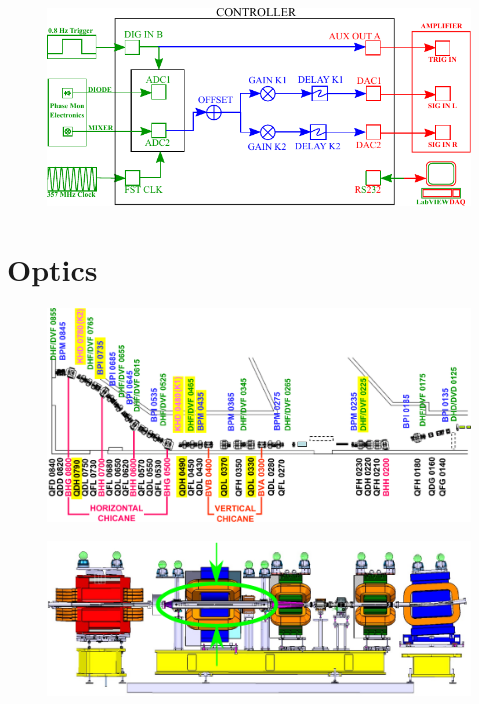 \documentclass[%
 reprint,
 superscriptaddress,
 amsmath,
 amssymb,
 prstab,
]{revtex4-1}
\begin{document}
\begin{figure}
	\includegraphics[width=\textwidth]{figs/hw/fontDiagram}%
	\caption{\label{f:fontDiagram}
	}
\end{figure}

\section{\label{s:optics}Optics}

\begin{figure}
	\includegraphics[width=\columnwidth]{figs/optics/TL2Lattice}%
	\caption{\label{f:TL2Lattice}
	}
\end{figure}

\begin{figure}
	\includegraphics[width=\columnwidth]{figs/optics/kickerInsideQuad}%
	\caption{\label{f:kickerInsideQuad}
	}
\end{figure}
\end{document}
